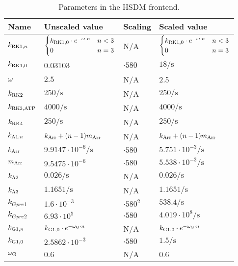 \documentclass[a4paper, 12pt]{book}
\begin{document}
\begin{table}[H]
\centering
\caption{Parameters in the HSDM frontend.}
\begin{tabular}{l | l | l | l}
Name & Unscaled value & Scaling & Scaled value \\
\hline
\hline
$k_{{\rm RK1,}n}$ & 
$\begin{cases}
k_{{\rm RK1},0} \cdot e^{-\omega \cdot n} & n < 3 \\
0 & n=3
\end{cases}$ & N/A & 
$\begin{cases}
k_{{\rm RK1},0} \cdot e^{-\omega \cdot n} & n < 3 \\
0 & n=3
\end{cases}$\\
\hline
\textcolor{red}{$k_{{\rm RK1},0}$} & 0.03103 & $\cdot 580$ & $18/\mathrm{s}$\\
\hline
$\omega$ & $2.5$ & N/A & 2.5\\
\hline
$k_{\rm RK2}$ & $250/\mathrm{s}$ & N/A & $250/\mathrm{s}$\\
\hline
$k_{\rm RK3,ATP}$ & $4000/\mathrm{s}$ & N/A & $4000/\mathrm{s}$\\
\hline
$k_{\rm RK4}$ & $250/\mathrm{s}$ & N/A & $250/\mathrm{s}$\\
\hline
$k_{{\rm A1,}n}$ & $k_{\rm Arr} + (n-1) m_{\rm Arr}$ & N/A & $k_{\rm Arr} + (n-1) m_{\rm Arr}$\\
\hline
$k_{\rm Arr}$ & $9.9147\cdot 10^{-6}/\mathrm{s}$ & $\cdot 580$ & $5.751\cdot 10^{-3}/\mathrm{s}$ \\
\hline
$m_{\rm Arr}$ & $9.5475\cdot 10^{-6}$ & $\cdot 580$ & $5.538\cdot 10^{-3}/\mathrm{s}$\\
\hline
$k_{\rm A2}$ & $0.026/\mathrm{s}$ & N/A & $0.026/\mathrm{s}$\\
\hline
$k_{\rm A3}$ & $1.1651/\mathrm{s}$ & N/A & $1.1651/\mathrm{s}$\\
\hline
$k_{Gpre1}$ & $1.6\cdot 10^{-3}$ & $\cdot 580^2$ & $538.4/\mathrm{s}$\\
\hline
$k_{Gpre2}$ & $6.93\cdot 10^5$ & $\cdot 580$ & $4.019\cdot 10^8/\mathrm{s}$\\
\hline
$k_{{\rm G1},n}$ &  $k_{{\rm G1},0} \cdot e^{-\omega_{\rm G} \cdot n}$ & N/A & $k_{{\rm G1},0} \cdot e^{-\omega_{\rm G} \cdot n}$\\
\hline
\textcolor{red}{$k_{{\rm G1},0}$} & $2.5862\cdot 10^{-3}$ & $\cdot 580$ & $1.5/\mathrm{s}$\\
\hline
$\omega_{\rm G}$ & 0.6 & N/A & 0.6\\

\end{tabular}
\end{table}
\end{document}

